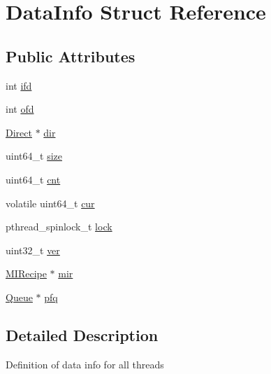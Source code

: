 \hypertarget{structDataInfo}{\section{\-Data\-Info \-Struct \-Reference}
\label{structDataInfo}
}
\subsection*{\-Public \-Attributes}
\begin{DoxyCompactItemize}
\item 
int \hyperlink{structDataInfo_a80e6980a10d0cda89031447bccbc9fbe}{ifd}
\item 
int \hyperlink{structDataInfo_a7a0722c3de92180f73c4e06611132ed1}{ofd}
\item 
\hyperlink{structDirect}{\-Direct} $\ast$ \hyperlink{structDataInfo_a9197ff2b89a692f1ed9faca47d5e6e41}{dir}
\item 
uint64\-\_\-t \hyperlink{structDataInfo_a48e1e104444c91f1ed5a8c5063123da2}{size}
\item 
uint64\-\_\-t \hyperlink{structDataInfo_ad390a39f9b2b1bf9cb97b080f145e4cc}{cnt}
\item 
volatile uint64\-\_\-t \hyperlink{structDataInfo_af568214ced191e48f92e5373c5273282}{cur}
\item 
pthread\-\_\-spinlock\-\_\-t \hyperlink{structDataInfo_ab26e1a2ea30711ab136449d3c8341c59}{lock}
\item 
uint32\-\_\-t \hyperlink{structDataInfo_a1da1223452f43d4d819c1f1206c4df0f}{ver}
\item 
\hyperlink{structMIRecipe}{\-M\-I\-Recipe} $\ast$ \hyperlink{structDataInfo_a13fc7eb1fc2e6d166632515151a15edc}{mir}
\item 
\hyperlink{structQueue}{\-Queue} $\ast$ \hyperlink{structDataInfo_ad99e6efd3299160bbc4e305d4af52264}{pfq}
\end{DoxyCompactItemize}


\subsection{\-Detailed \-Description}
\-Definition of data info for all threads 


